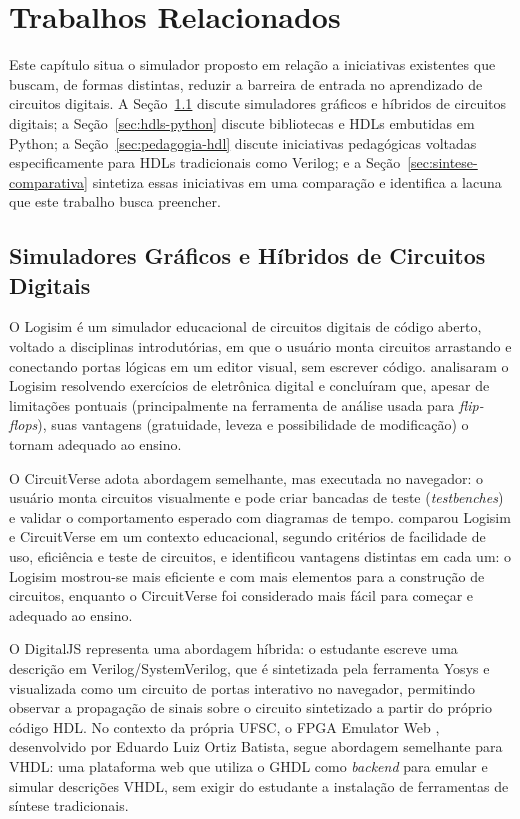 \chapter{Trabalhos Relacionados}
\label{cap:trabalhos}

Este capítulo situa o simulador proposto em relação a iniciativas existentes que buscam, de formas distintas, reduzir a barreira de entrada no aprendizado de circuitos digitais. A Seção~\ref{sec:sim-graficos} discute simuladores gráficos e híbridos de circuitos digitais; a Seção~\ref{sec:hdls-python} discute bibliotecas e HDLs embutidas em Python; a Seção~\ref{sec:pedagogia-hdl} discute iniciativas pedagógicas voltadas especificamente para HDLs tradicionais como Verilog; e a Seção~\ref{sec:sintese-comparativa} sintetiza essas iniciativas em uma comparação e identifica a lacuna que este trabalho busca preencher.

\section{Simuladores Gráficos e Híbridos de Circuitos Digitais}
\label{sec:sim-graficos}

O Logisim \cite{burch2002} é um simulador educacional de circuitos digitais de código aberto, voltado a disciplinas introdutórias, em que o usuário monta circuitos arrastando e conectando portas lógicas em um editor visual, sem escrever código.  analisaram o Logisim resolvendo exercícios de eletrônica digital e concluíram que, apesar de limitações pontuais (principalmente na ferramenta de análise usada para \textit{flip-flops}), suas vantagens (gratuidade, leveza e possibilidade de modificação) o tornam adequado ao ensino.

O CircuitVerse \cite{circuitverse} adota abordagem semelhante, mas executada no navegador: o usuário monta circuitos visualmente e pode criar bancadas de teste (\textit{testbenches}) e validar o comportamento esperado com diagramas de tempo.  comparou Logisim e CircuitVerse em um contexto educacional, segundo critérios de facilidade de uso, eficiência e teste de circuitos, e identificou vantagens distintas em cada um: o Logisim mostrou-se mais eficiente e com mais elementos para a construção de circuitos, enquanto o CircuitVerse foi considerado mais fácil para começar e adequado ao ensino.

O DigitalJS \cite{materzok2019} representa uma abordagem híbrida: o estudante escreve uma descrição em Verilog/SystemVerilog, que é sintetizada pela ferramenta Yosys e visualizada como um circuito de portas interativo no navegador, permitindo observar a propagação de sinais sobre o circuito sintetizado a partir do próprio código HDL. No contexto da própria UFSC, o FPGA Emulator Web \cite{fpgaemuweb}, desenvolvido por Eduardo Luiz Ortiz Batista, segue abordagem semelhante para VHDL: uma plataforma web que utiliza o GHDL como \textit{backend} para emular e simular descrições VHDL, sem exigir do estudante a instalação de ferramentas de síntese tradicionais.

